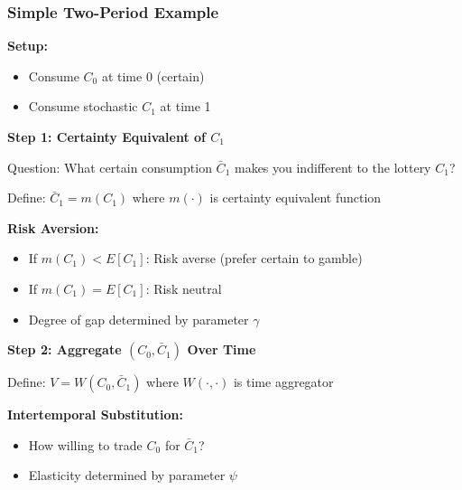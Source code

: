 \documentclass{beamer}
\begin{document}
\begin{frame}
    \frametitle{Simple Two-Period Example}
    
    \textbf{Setup:}
    \begin{itemize}
        \item Consume $C_0$ at time 0 (certain)
        \item Consume stochastic $C_1$ at time 1
    \end{itemize}
    
    
    \textbf{Step 1: Certainty Equivalent of $C_1$}
    
    Question: What certain consumption $\bar{C}_1$ makes you indifferent to the lottery $C_1$?
    
    Define: $\bar{C}_1 = m(C_1)$ where $m(\cdot)$ is certainty equivalent function
    
    
    \textbf{Risk Aversion:}
    \begin{itemize}
        \item If $m(C_1) < E[C_1]$: Risk averse (prefer certain to gamble)
        \item If $m(C_1) = E[C_1]$: Risk neutral
        \item Degree of gap determined by parameter $\gamma$
    \end{itemize}
    
    
    \textbf{Step 2: Aggregate $(C_0, \bar{C}_1)$ Over Time}
    
    Define: $V = W(C_0, \bar{C}_1)$ where $W(\cdot, \cdot)$ is time aggregator
    
    
    \textbf{Intertemporal Substitution:}
    \begin{itemize}
        \item How willing to trade $C_0$ for $\bar{C}_1$?
        \item Elasticity determined by parameter $\psi$
    \end{itemize}
    
\end{frame}
\end{document}
